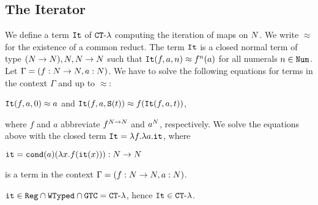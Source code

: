\subsection{The Iterator}\label{subsection-iterator}
\begin{example}\label{example:iterator}
We define a term ${\tt It}$ of  ${ {\tt CT}\mbox{-}\lambda}$ computing the iteration of maps on ${N}$.
We write $\approx$ for
the existence of a common reduct.
The term ${\tt It}$ is a closed normal term of type $({N} \rightarrow {N}), {N},{N} \rightarrow {N}$ such 
that ${\tt It}(f,a,n) \approx f^n(a)$ for all numerals $n \in {\tt Num}$. 
Let $\Gamma = (f:{N} \rightarrow {N}, a:{N})$. 
We have to solve the following equations for terms in the context $\Gamma$
and up to $\approx$:
\begin{center}
  ${\tt It}(f,a,0) \approx a$
  \hspace{5ex}
  and
  \hspace{5ex}  
  ${\tt It}(f,a,{\tt S} (t)) \approx f({\tt It}(f,a,t))$,
\end{center}
where $f$ and $a$ abbreviate $f^{{N}\rightarrow{N}}$ and $a^{N}$, respectively.
We solve the equations above with the closed term ${\tt It} = \lambda f. \lambda a.{\tt it}$,
where 
\begin{center}
${\tt it} = {\tt cond} (a)(\lambda x.f({\tt it}(x))):{N} \rightarrow {N}$
\end{center}
is a term in the context $\Gamma = (f:{N} \rightarrow {N}, a:{N})$.
\end{example}

\begin{proposition}
\label{proposition-iterator-in-CT-lambda}
${\tt it} \in {\tt Reg} \cap {\tt WTyped} \cap {\tt GTC} = { {\tt CT}\mbox{-}\lambda}$, 
hence ${\tt It} \in { {\tt CT}\mbox{-}\lambda}$.
\end{proposition}


